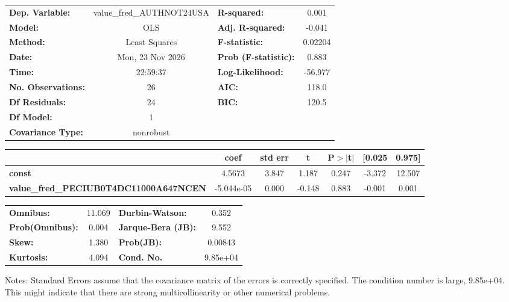 \begin{center}
\begin{tabular}{lclc}
\toprule
\textbf{Dep. Variable:}                        & value\_fred\_AUTHNOT24USA & \textbf{  R-squared:         } &     0.001   \\
\textbf{Model:}                                &            OLS            & \textbf{  Adj. R-squared:    } &    -0.041   \\
\textbf{Method:}                               &       Least Squares       & \textbf{  F-statistic:       } &   0.02204   \\
\textbf{Date:}                                 &      Mon, 23 Nov 2026     & \textbf{  Prob (F-statistic):} &    0.883    \\
\textbf{Time:}                                 &          22:59:37         & \textbf{  Log-Likelihood:    } &   -56.977   \\
\textbf{No. Observations:}                     &               26          & \textbf{  AIC:               } &     118.0   \\
\textbf{Df Residuals:}                         &               24          & \textbf{  BIC:               } &     120.5   \\
\textbf{Df Model:}                             &                1          & \textbf{                     } &             \\
\textbf{Covariance Type:}                      &         nonrobust         & \textbf{                     } &             \\
\bottomrule
\end{tabular}
\begin{tabular}{lcccccc}
                                               & \textbf{coef} & \textbf{std err} & \textbf{t} & \textbf{P$> |$t$|$} & \textbf{[0.025} & \textbf{0.975]}  \\
\midrule
\textbf{const}                                 &       4.5673  &        3.847     &     1.187  &         0.247        &       -3.372    &       12.507     \\
\textbf{value\_fred\_PECIUB0T4DC11000A647NCEN} &   -5.044e-05  &        0.000     &    -0.148  &         0.883        &       -0.001    &        0.001     \\
\bottomrule
\end{tabular}
\begin{tabular}{lclc}
\textbf{Omnibus:}       & 11.069 & \textbf{  Durbin-Watson:     } &    0.352  \\
\textbf{Prob(Omnibus):} &  0.004 & \textbf{  Jarque-Bera (JB):  } &    9.552  \\
\textbf{Skew:}          &  1.380 & \textbf{  Prob(JB):          } &  0.00843  \\
\textbf{Kurtosis:}      &  4.094 & \textbf{  Cond. No.          } & 9.85e+04  \\
\bottomrule
\end{tabular}
\end{center}

Notes: \newline
 [1] Standard Errors assume that the covariance matrix of the errors is correctly specified. \newline
 [2] The condition number is large, 9.85e+04. This might indicate that there are \newline
 strong multicollinearity or other numerical problems.